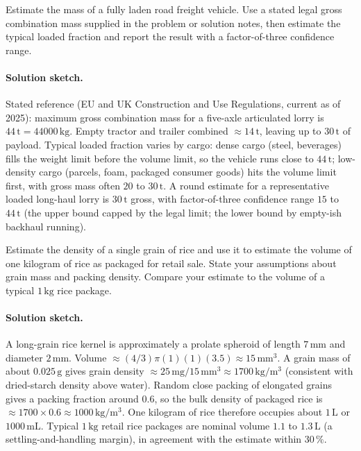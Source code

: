 \begin{exercise}
Estimate the mass of a fully laden road freight vehicle. Use a
stated legal gross combination mass supplied in the problem or
solution notes, then estimate the typical loaded fraction and report
the result with a factor-of-three confidence
range.
\end{exercise}

\paragraph{Solution sketch.}
Stated reference (EU and UK Construction and Use Regulations,
current as of 2025): maximum gross combination mass for a
five-axle articulated lorry is $44 \,\si{\tonne} = 44000 \,\si
{\kilogram}$. Empty tractor and trailer combined $\approx 14 \,\si
{\tonne}$, leaving up to $30 \,\si{\tonne}$ of payload. Typical
loaded fraction varies by cargo: dense cargo (steel, beverages)
fills the weight limit before the volume limit, so the vehicle
runs close to $44 \,\si{\tonne}$; low-density cargo (parcels,
foam, packaged consumer goods) hits the volume limit first, with
gross mass often $20$ to $30 \,\si{\tonne}$. A round estimate for
a representative loaded long-haul lorry is $30 \,\si{\tonne}$ gross,
with factor-of-three confidence range $15$ to $44 \,\si{\tonne}$
(the upper bound capped by the legal limit; the lower bound by
empty-ish backhaul running).

\begin{exercise}
Estimate the density of a single grain of rice and use it to
estimate the volume of one kilogram of rice as packaged for retail
sale. State your assumptions about grain mass and packing density.
Compare your estimate to the volume of a typical $1 \,\si{\kilogram}$
rice package.
\end{exercise}

\paragraph{Solution sketch.}
A long-grain rice kernel is approximately a prolate spheroid of
length $7 \,\si{\milli\meter}$ and diameter $2 \,\si{\milli\meter}$.
Volume $\approx (4/3)\pi (1)(1)(3.5) \approx 15 \,\si{\milli
\meter\cubed}$. A grain mass of about $0.025 \,\si{\gram}$ gives
grain density $\approx 25 \,\si{\milli\gram} / 15 \,\si{\milli\meter
\cubed} \approx 1700 \,\si{\kilogram\per\meter\cubed}$ (consistent
with dried-starch density above water). Random close packing of
elongated grains gives a packing fraction around $0.6$, so the bulk
density of packaged rice is $\approx 1700 \times 0.6 \approx 1000 \,
\si{\kilogram\per\meter\cubed}$. One kilogram of rice therefore
occupies about $1 \,\si{\liter}$ or $1000 \,\si{\milli\liter}$.
Typical $1 \,\si{\kilogram}$ retail rice packages are nominal volume
$1.1$ to $1.3 \,\si{\liter}$ (a settling-and-handling margin), in
agreement with the estimate within $30\,\%$.

